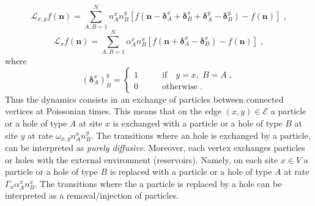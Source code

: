 \documentclass[10pt]{article}
\numberwithin{equation}{section}
\numberwithin{equation}{subsection}
\newcommand{\co}{\;,}
\newcommand{\dt}{\;.}
\begin{document}
\begin{equation}\label{edgeGenerator}
\mathcal{L}_{x,y}f(\bm{n})=\sum_{A,B=1}^{N}n_{A}^{x}n_{B}^{y}\left[f(\bm{n}-\bm{\delta}^{x}_{A}+\bm{\delta}_{B}^{x}+\bm{\delta}_{A}^{y}-\bm{\delta}_{B}^{y})-f(\bm{n})\right]\co
\end{equation}
\begin{equation}\label{siteGenerator}
    \mathcal{L}_{x}f(\bm{n})=\sum_{A,B=1}^{N}\alpha_{A}^{x}n_{B}^{x}\left[f(\bm{n}+\bm{\delta}_{A}^{x}-\bm{\delta}_{B}^{x})-f(\bm{n})\right]\co
\end{equation}
where 
\begin{equation}
(\bm{\delta}_{A}^{x})^{y}_{B}=\begin{cases}
1\qquad &\text{if}\quad y=x,\;B=A\;,\\
0\qquad &\text{otherwise}\dt
\end{cases}
\end{equation}
Thus the dynamics consists in an exchange of particles between connected vertices at Poissonian times. 
This means that on the edge $(x,y)\in \mathcal{E}$  a particle {\color{blue}or a hole} of type $A$ at site $x$ is exchanged with a particle {\color{blue}or a hole} of type $B$ at site $y$ at rate $\omega_{x,y}n_{A}^{x}n_{B}^{y}$. {\color{blue} The transitions where an hole is exchanged by a particle, can be interpreted as \textit{purely diffusive}.}
Moreover, each vertex  exchanges particles {\color{blue} or holes} with the external environment (reservoirs). 
Namely, on each site $x\in V$  a particle {\color{blue} or a hole} of type $B$ is replaced with a particle {\color{blue} or a hole} of type $A$ at rate $\Gamma_{x}\alpha_{A}^{x}n_{B}^{x}$. {\color{blue}The transitions where the a particle is replaced by a hole can be interpreted as a removal/injection of particles.}
%
\end{document}

